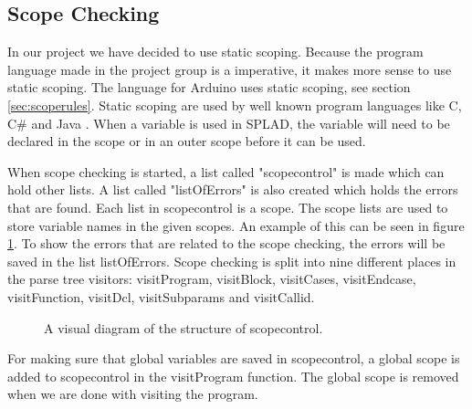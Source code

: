 \subsection{Scope Checking}
\label{sec:scopecheck}
In our project we have decided to use static scoping. Because the program language made in the project group is a imperative, it makes more sense to use static scoping. The language for Arduino uses static scoping, see section \ref{sec:scoperules}. Static scoping are used by well known program languages like C, C\# and Java \citep{ProgrammingCommunityIndex}. When a variable is used in SPLAD, the variable will need to be declared in the scope or in an outer scope before it can be used.

When scope checking is started, a list called "scopecontrol" is made which can hold other lists. A list called "listOfErrors" is also created which holds the errors that are found. Each list in scopecontrol is a scope. The scope lists are used to store variable names in the given scopes. An example of this can be seen in figure \ref{fig:scopediagram}. To show the errors that are related to the scope checking, the errors will be saved in the list listOfErrors. Scope checking is split into nine different places in the parse tree visitors: visitProgram, visitBlock, visitCases, visitEndcase, visitFunction, visitDcl, visitSubparams and visitCallid.

\begin{figure}[H]

\centering
{}
\caption{A visual diagram of the structure of scopecontrol.}
\label{fig:scopediagram}
\end{figure}

For making sure that global variables are saved in scopecontrol, a global scope is added to scopecontrol in the visitProgram function. The global scope is removed when we are done with visiting the program.

